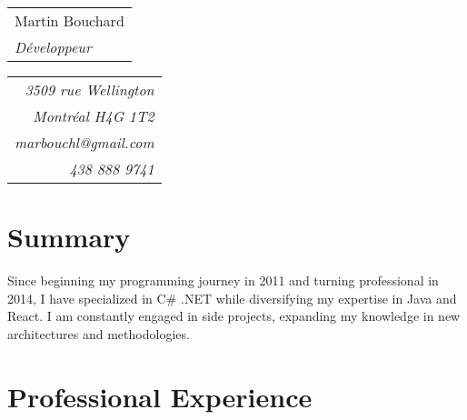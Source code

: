 \documentclass[a4paper,11pt]{extarticle}
\begin{document}
\begin{table}[ht]
\begin{minipage}[b]{0.74\textwidth}
\begin{tabular}{l}

\fontsize{43}{36}\textsf{Martin Bouchard}%
 \vspace{0.6em}\\\LARGE{\textit{Développeur}}
\end{tabular}
\end{minipage}
\hspace{0.5cm}
\noindent
\begin{minipage}[b]{0.15\textwidth}\raggedright
\begin{tabular}{|r}
\\
  \textit{3509 rue Wellington}  \\
   \textit{Montréal H4G 1T2}\\ 
  \textit{marbouchl@gmail.com} \\
   \textit{438 888 9741}  
\end{tabular}
\end{minipage}
\end{table}
\section{Summary}
{Since beginning my programming journey in 2011 and turning professional in 2014, I have specialized in C\# .NET while diversifying my expertise in Java and React. I am constantly engaged in side projects, expanding my knowledge in new architectures and methodologies.}
\vspace{-1em}

\section{Professional Experience}
\end{document}
